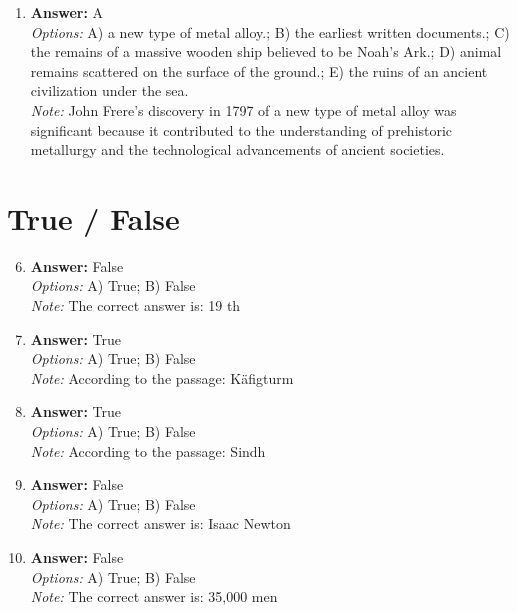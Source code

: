 \documentclass[12pt]{article}
\begin{document}
\begin{enumerate}[label=\arabic*.]
\\ \textit{Note:} The correct answer highlights that the Gault site was strategically selected by Paleoindians due to its closeness to a chert source, which was essential for crafting durable stone tools necessary for their survival and daily activities.
\item \textbf{Answer:} A
\\ \textit{Options:} A) a new type of metal alloy.; B) the earliest written documents.; C) the remains of a massive wooden ship believed to be Noah's Ark.; D) animal remains scattered on the surface of the ground.; E) the ruins of an ancient civilization under the sea.
\\ \textit{Note:} John Frere's discovery in 1797 of a new type of metal alloy was significant because it contributed to the understanding of prehistoric metallurgy and the technological advancements of ancient societies.
\end{enumerate}

\section*{True / False}
\begin{enumerate}[label=\arabic*.]
\setcounter{enumi}{5}
\item \textbf{Answer:} False
\\ \textit{Options:} A) True; B) False
\\ \textit{Note:} The correct answer is: 19 th
\item \textbf{Answer:} True
\\ \textit{Options:} A) True; B) False
\\ \textit{Note:} According to the passage: Käfigturm
\item \textbf{Answer:} True
\\ \textit{Options:} A) True; B) False
\\ \textit{Note:} According to the passage: Sindh
\item \textbf{Answer:} False
\\ \textit{Options:} A) True; B) False
\\ \textit{Note:} The correct answer is: Isaac Newton
\item \textbf{Answer:} False
\\ \textit{Options:} A) True; B) False
\\ \textit{Note:} The correct answer is: 35,000 men
\end{enumerate}
\end{document}
